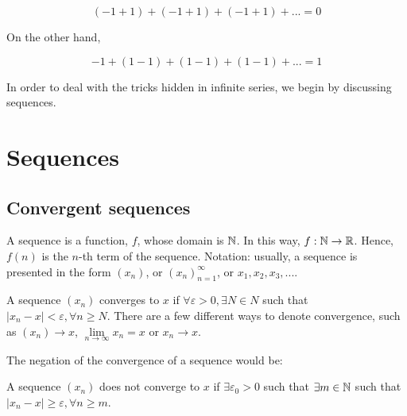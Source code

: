 \begin{equation*}
    (-1 + 1) + (-1 + 1) + (-1 + 1) + ... = 0
\end{equation*}

On the other hand,

\begin{equation*}
    -1 + (1-1) + (1-1) + (1-1) + ... = 1
\end{equation*}

In order to deal with the tricks hidden in infinite series, we begin by discussing sequences.

\section{Sequences}

\subsection{Convergent sequences}

\begin{definition}[Sequence]
    A sequence is a function, $f$, whose domain is $\mathbb{N}$. In this way, $f: \mathbb{N} \to \mathbb{R}$. Hence, $f(n)$ is the $n$-th term of the sequence. Notation: usually, a sequence is presented in the form $(x_n)$, or $(x_n)_{n=1}^\infty$, or $ x_1, x_2, x_3, ...$.
\end{definition}

\begin{definition}
    A sequence $(x_n)$ converges to $x$ if $\forall \varepsilon > 0, \exists N \in N$ such that $|x_n - x| < \varepsilon, \forall n \geq N$. There are a few different ways to denote convergence, such as $(x_n) \to x$, $\lim \limits_{n \to \infty} x_n = x$ or $x_n \to x$.
\end{definition}

The negation of the convergence of a sequence would be:

\begin{definition}
    A sequence  $( x_n)$ does not converge to $x$ if $\exists \varepsilon_0 > 0$ such that $\exists m \in \mathbb{N}$ such that $|x_n - x| \geq \varepsilon, \forall n \geq m$.
\end{definition}

